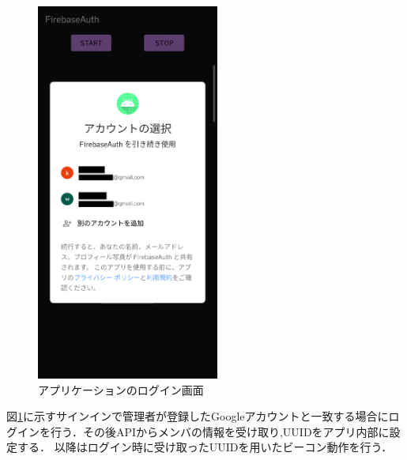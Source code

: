\newpage

\begin{figure}[tbh]
  \centering
  \includegraphics[width=6cm]{image/AppSignIn.png}
  \caption{アプリケーションのログイン画面}
  \label{fig:AppSignIn}
\end{figure}


図\ref{fig:AppSignIn}に示すサインインで管理者が登録したGoogleアカウントと一致する場合にログインを行う．その後APIからメンバの情報を受け取り,UUIDをアプリ内部に設定する．
以降はログイン時に受け取ったUUIDを用いたビーコン動作を行う．


